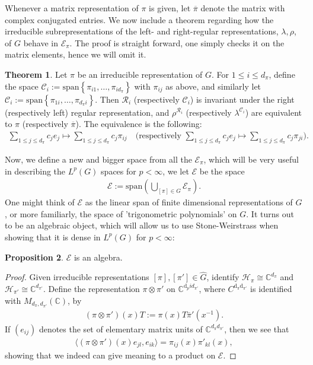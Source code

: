 \documentclass[10pt,twoside,openany,final]{memoir}
\theoremstyle{definition}
\newtheorem{theorem}{Theorem}[chapter]
\newtheorem{proposition}[theorem]{Proposition}
\theoremstyle{Break}
\newcommand{\C}{\mathbb{C}}
\newcommand{\G}{\widehat{G}}
\renewcommand{\H}{\mathcal{H}}
\renewcommand{\d}{\mathrm{d}}
\begin{document}
Whenever a matrix representation of $\pi$ is given, let $\overline{\pi}$ denote the matrix with complex conjugated entries. We now include a theorem regarding how the irreducible subrepresentations of the left- and right-regular representations, $\lambda, \rho$, of $G$ behave in $\mathcal{E}_\pi$. The proof is straight forward, one simply checks it on the matrix elements, hence we will omit it.
\begin{theorem}
	Let $\pi$ be an irreducible representation of $G$. For $1 \leq i \leq d_\pi$, define the space $\mathcal{C}_{i}:=\mathrm{span}\left\{ \pi_{i1},\dots,\pi_{id_{\pi}}\right\}$ with $\pi_{ij}$ as above, and similarly let $\mathcal{C}_i:= \mathrm{span}\left\{ \pi_{1i},\dots,\pi_{d_\pi i} \right\}$. Then $\mathcal{R}_i$ (respectively $\mathcal{C}_i$) is invariant under the right (respectively left) regular representation, and $\rho^{\mathcal{R}_i}$ (respectively $\lambda^{\mathcal{C}_i}$) are equivalent to $\pi$ (respectively $\overline{\pi}$). The equivalence is the following:
	\begin{align*}
		\sum_{1 \leq j \leq d_{\pi}}c_j e_j \mapsto \sum_{1 \leq j \leq d_\pi} c_j \pi_{ij} \quad \Big(\text{respectively }\sum_{1 \leq j \leq d_\pi }c_j e_j \mapsto \sum_{1 \leq j \leq d_\pi} c_j \pi_{ji}\Big).
	\end{align*}
	\label{5.9}
\end{theorem}
Now, we define a new and bigger space from all the $\mathcal{E}_\pi$, which will be very useful in describing the $L^p(G)$ spaces for $p<\infty$, we let $\mathcal{E}$ be the space
\begin{align*}
	\mathcal{E}:= \mathrm{span}\left( \bigcup_{[\pi] \in \G} \mathcal{E}_\pi \right).
\end{align*}
One might think of $\mathcal{E}$ as the linear span of finite dimensional representations of $G$, or more familiarly, the space of 'trigonometric polynomials' on $G$. It turns out to be an algebraic object, which will allow us to use Stone-Weirstrass when showing that it is dense in $L^p(G)$ for $p < \infty$:
\begin{proposition}
	$\mathcal{E}$ is an algebra.
	\label{5.10}	
\end{proposition}
\begin{proof}
	Given irreducible representations $[\pi],[\pi'] \in \G$, identify $\H_\pi \cong \C^{d_\pi}$ and $\H_{\pi'} \cong \C^{d_ {\pi'}}$. Define the representation $\pi \otimes \pi'$ on $\C^{\d_pi d_{\pi'}}$, where $C^{\d_\pi \d_{\pi'}}$ is identified with $M_{d_{\pi},d_{\pi'}}(\C)$, by
	\begin{align*}
		(\pi \otimes \pi')(x) T := \pi(x) T \overline{\pi}'(x^{-1}).
	\end{align*}
	If $(e_{ij})$ denotes the set of elementary matrix units of $\C^{d_\pi d_{\pi'}}$, then we see that
	\begin{align*}
		\langle (\pi \otimes \pi')(x) e_{jl},e_{ik}\rangle = \pi_{ij}(x) \pi'_{kl}(x),
	\end{align*}
	showing that we indeed can give meaning to a product on $\mathcal{E}$.
\end{proof}
\end{document}
